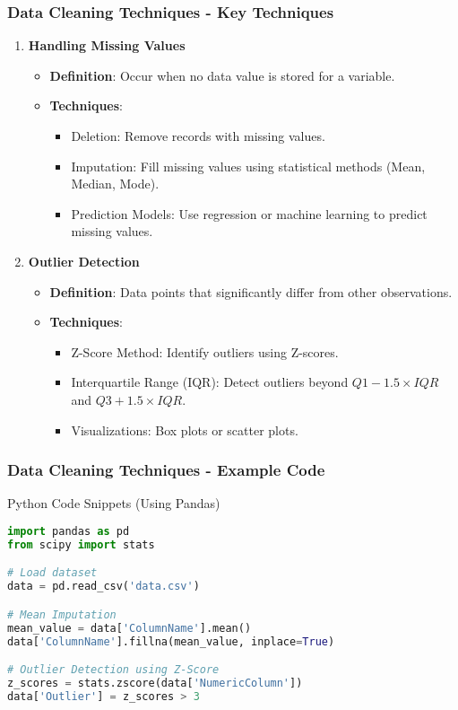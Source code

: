 \documentclass[aspectratio=169]{beamer}
\begin{document}
\begin{frame}[fragile]
    \frametitle{Data Cleaning Techniques - Key Techniques}
    \begin{enumerate}
        \item \textbf{Handling Missing Values}
        \begin{itemize}
            \item \textbf{Definition}: Occur when no data value is stored for a variable.
            \item \textbf{Techniques}:
            \begin{itemize}
                \item Deletion: Remove records with missing values.
                \item Imputation: Fill missing values using statistical methods (Mean, Median, Mode).
                \item Prediction Models: Use regression or machine learning to predict missing values.
            \end{itemize}
        \end{itemize}
        
        \item \textbf{Outlier Detection}
        \begin{itemize}
            \item \textbf{Definition}: Data points that significantly differ from other observations.
            \item \textbf{Techniques}:
            \begin{itemize}
                \item Z-Score Method: Identify outliers using Z-scores.
                \item Interquartile Range (IQR): Detect outliers beyond \( Q1 - 1.5 \times IQR \) and \( Q3 + 1.5 \times IQR \).
                \item Visualizations: Box plots or scatter plots.
            \end{itemize}
        \end{itemize}
    \end{enumerate}
\end{frame}

\begin{frame}[fragile]
    \frametitle{Data Cleaning Techniques - Example Code}
    \begin{block}{Python Code Snippets (Using Pandas)}
    \begin{lstlisting}[language=Python]
import pandas as pd
from scipy import stats

# Load dataset
data = pd.read_csv('data.csv')

# Mean Imputation
mean_value = data['ColumnName'].mean()
data['ColumnName'].fillna(mean_value, inplace=True)

# Outlier Detection using Z-Score
z_scores = stats.zscore(data['NumericColumn'])
data['Outlier'] = z_scores > 3
    \end{lstlisting}
    \end{block}
\end{frame}
\end{document}
